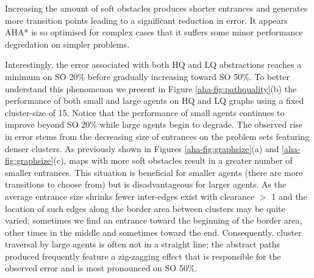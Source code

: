 Increasing the amount of soft obstacles produces shorter entrances and generates more transition points leading to a significant reduction in error. 
It appears AHA* is so optimised for complex cases that it suffers some minor performance degredation on simpler problems. 
\par \indent
Interestingly, the error associated with both HQ and LQ abstractions reaches a minimum on SO 20\% before gradually increasing toward SO 50\%. 
To better understand this phenomenon we present in Figure \ref{aha-fig:pathquality}(b) the performance of both small and large agents on HQ and LQ graphs using a fixed cluster-size of 15.
Notice that the performance of small agents continues to improve beyond SO 20\% while large agents begin to degrade.
The observed rise in error stems from the decreasing size of entrances on the problem sets featuring denser clusters. 
As previously shown in Figures \ref{aha-fig:graphsize}(a) and \ref{aha-fig:graphsize}(c), maps with more soft obstacles result in a greater number of smaller entrances. 
This situation is beneficial for smaller agents (there are more transitions to choose from) but is disadvantageous for larger agents.
As the average entrance size shrinks fewer inter-edges exist with clearance $>$ 1 and the location of such edges along the border area between clusters may be quite varied; sometimes we find an entrance toward the beginning of the border area, other times in the middle and sometimes toward the end.
Consequently, cluster traversal by large agents is often not in a straight line; the abstract paths produced frequently feature a zig-zagging effect that is responsible for the observed error and is most pronounced on SO 50\%.
